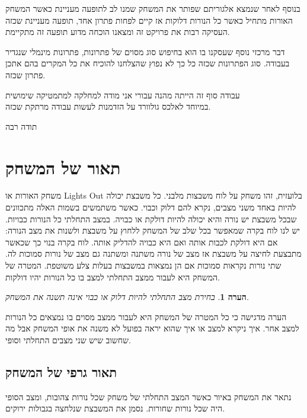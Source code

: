 \documentclass[12pt,leqno]{article}
\theoremstyle{theoremdd}
\newtheorem{comm}{הערה}[section]
\begin{document}
בנוסף 
לאחר שנמצא אלגוריתם שפותר את המשחק שמנו לב לתופעה מעניינת  כאשר המשחק האורות
מתחיל כאשר כל הנורות דלוקות אז קיים לפחות פתרון אחד,
תופעה מעניינת שכזה העסיקה רבות את פרויקט זה ומצאנו הוכחה מדוע תופעה זה מתקיימת.

דבר מרכזי נוסף שעסקנו בו הוא בחיפוש סוג מסוים של פתרונות, פתרונות מינמלי שנגדיר בעבודה. 
סוג הפתרונות שכזה כל כך לא נפוץ שהצלחנו להוכיח את כל המקרים 
בהם אתכן פתרון שכזה.

עבודה סוף זה הייתה מהנה עבורי אני מודה למחלקה
למתמטיקה שימושית
\\
במיוחד לאלכס גולוורד על הזדמנות לעשות 
עבודה מרתקת שכזה.

תודה רבה

\newpage

\section{תאור של המשחק}
משחק האורות או 
\textenglish{Lights Out}
בלועזית,
זהו משחק על לוח משבצות מלבני.
כל משבצת יכולה להיות באחד משני מצבים, נקרא להם דלוק וכבוי.
כאשר משתמשים בשמות האלה מתכוונים שבכל משבצת יש נורה והיא יכולה להיות דולקת או כבויה. במצב התחלתי כל הנורות כבויות.
יש לנו לוח בקרה שמאפשר בכל שלב של המשחק ללחוץ על משבצת ולשנות את מצב הנורה: אם היא דולקת לכבות אותה ואם היא כבויה להדליק אותה.
לוח בקרה בנוי כך שכאשר מתבצעת לחיצה על משבצת אז מצב של נורה משתנה ומשתנה גם מצב של נורות סמוכות לה.
שתי נורות נקראות סמוכות אם הן נמצאות במשבצות בעלות צלע משוטפת.
המטרה של המשחק היא לעבור ממצב התחלתי למצב בו כל הנורות יהיו דולקות. 

\begin{comm}
    בחירת מצב התחלתי להיות דלוק או כבוי אינה תשנה את המשחק.
\end{comm}
הערה מדגישה כי כל המטרה של המשחק היא לעבור ממצב מסוים בו נמצאים כל הנורות למצב אחר.
איך ניקרא למצב או איך שהוא יראה בפועל לא משנה את אופי המשחק אבל מה שחשוב שיש שני מצבים התחלתי וסופי.

\subsection{תאור גרפי של המשחק}
נתאר את המשחק באיור כאשר
המצב התחלתי של משחק שכל נורות
צהובות, ומצב הסופי היה שכל נורות שחורות.
נסמן את המשבצת שנלחצה בגבולות ירוקים.
\end{document}
